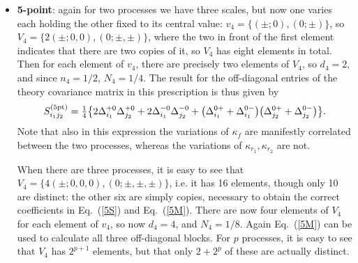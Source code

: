 \begin{itemize}
\item \textbf{5-point}: again for two processes we have three
  scales, but now one varies each holding the other fixed to its central 
value: $v_4 =  \{(\pm;0),(0;\pm)\}$, so  
$V_4 = \{2(\pm;0,0), (0;\pm,\pm)\}$, where the two in front of the
  first element indicates that there are two copies of it, so $V_4$
  has eight elements in total.
%
  Then for each element of $v_4$, there are
  precisely two elements of $V_4$, so $d_4=2$, and since $n_4=1/2$,
  $N_4=1/4$.
  The result for the off-diagonal entries of the theory covariance matrix
  in this prescription is thus  given by
\begin{equation}\label{5M}
    S^{(\rm 5pt)}_{i_1j_2} = \hbox{${{1}\over {4}}$}\big\{ 2\Delta_{i_1}^{+0}\Delta_{j_2}^{+0} + 2\Delta_{i_1}^{-0}\Delta_{j_2}^{-0}  
            + \big(\Delta_{i_1}^{0+} + \Delta_{i_1}^{0-} \big)\big(\Delta_{j_2}^{0+} + \Delta_{j_2}^{0-}\big)\big\}.
\end{equation}
Note that also in this expression the variations of  $\kappa_f$ are
manifestly correlated between the two processes, whereas the
variations of $\kappa_{r_1}, \kappa_{r_2}$ are not.  

When there are three processes, it is easy to see that 
$V_4 = \{4(\pm;0,0,0), (0;\pm,\pm,\pm)\}$, i.e. it has 16 elements,
though only 10 are distinct: the other six are simply copies,
necessary to obtain the correct coefficients in Eq.~(\ref{5S}) and
Eq.~(\ref{5M}).
%
There are now four elements of $V_4$ for each element of
$v_4$, so now $d_4=4$, and $N_4=1/8$.
%
Again Eq.~(\ref{5M}) can be used
to calculate all three off-diagonal blocks. For $p$ processes, it is
easy to see that $V_4$ has $2^{p+1}$ elements, but that only  
$2+2^p$ of these are actually distinct.   


\end{itemize}
